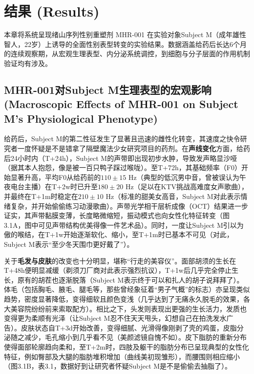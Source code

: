 
\section{结果 (Results)}

本章将系统呈现绪山序列性别重塑剂 MHR-001 在实验对象Subject M（成年雄性智人，22岁）上诱导的全面性别表型转变的实验结果。数据涵盖给药后长达6个月的连续观察期，从宏观生理表型、内分泌系统调控，到细胞与分子层面的作用机制验证均有涉及。

\subsection{MHR-001对Subject M生理表型的宏观影响 (Macroscopic Effects of MHR-001 on Subject M's Physiological Phenotype)}

给药后，Subject M的第二性征发生了显著且迅速的雌性化转变，其速度之快令研究者一度怀疑是不是错拿了隔壁魔法少女研究项目的药剂。在\textbf{声线变化}方面，给药后24小时内（T+24h），Subject M的声带即出现初步水肿，导致发声略显沙哑（据其本人抱怨，像是被一百只鸭子踩过喉咙）。至T+72h，其基础频率（F0）开始显著升高，平均F0从给药前的$110 \pm 15$ Hz（典型的低沉男中音，曾被误认为午夜电台主播）在T+2w时已升至$180 \pm 20$ Hz（足以在KTV挑战高难度女声歌曲），并最终在T+1m时稳定在$210 \pm 10$ Hz（标准的甜美女高音，Subject M对此表示情绪复杂，并开始偷偷练习动漫歌曲）。声带光学相干层析成像（OCT）结果进一步证实，其声带黏膜变薄，长度略微缩短，振动模式也向女性化特征转变（图3.1A，图中可见声带结构优美得像一件艺术品）。同时，一度让Subject M引以为傲的喉结，在T+1w开始逐渐软化、缩小，至T+1m时已基本不可见（对此，Subject M表示“至少冬天围巾更好戴了”）。

关于\textbf{毛发与皮肤}的改变也十分明显，堪称“行走的美容仪”。面部胡须的生长在T+48h便明显减缓（剃须刀厂商对此表示强烈抗议），T+1w后几乎完全停止生长，原有的胡茬也逐渐脱落（Subject M表示终于可以和扎人的胡子说拜拜了）。体毛（包括胸毛、腋毛、腿毛等，那些曾经象征着“男子气概”的标志）亦呈现类似趋势，密度显著降低，变得细软且颜色变浅（几乎达到了无痛永久脱毛的效果，各大美容院纷纷前来索取配方）。相比之下，头发则表现出更强的生长活力，发质也变得更为柔顺有光泽（让Subject M忍不住天天甩头，幻想自己在拍洗发水广告）。皮肤状态自T+3d开始改善，变得细腻、光滑得像刚剥了壳的鸡蛋，皮脂分泌随之减少，毛孔缩小到几乎看不见（美颜滤镜自愧不如）。皮下脂肪的重新分布使得面部轮廓趋向柔和，至T+2m时，四肢及躯干的脂肪分布已呈现典型的女性化特征，例如臀部及大腿的脂肪堆积增加（曲线美初现雏形），而腰围则相应缩小（图3.1B，表3.1，数据好到让研究者怀疑Subject M是不是偷偷去抽脂了）。

